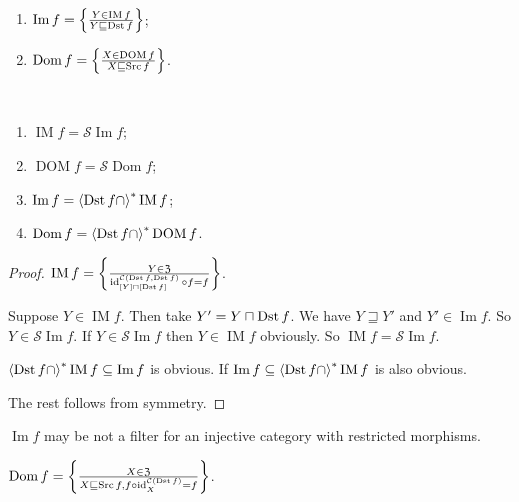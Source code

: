 \begin{defn}
~
\begin{enumerate}
\item $\operatorname{Im} f = \left\{ \frac{Y\in\operatorname{IM} f}{Y\sqsubseteq\operatorname{Dst} f}\right\}$;
\item $\operatorname{Dom} f = \left\{ \frac{X\in\operatorname{DOM} f}{X\sqsubseteq\operatorname{Src} f}\right\}$.
\end{enumerate}
\end{defn}

\begin{prop}
~
\begin{enumerate}
\item $\operatorname{IM} f = \mathscr{S}\operatorname{Im} f$;
\item $\operatorname{DOM} f = \mathscr{S}\operatorname{Dom} f$;
\item $\operatorname{Im} f = \left\langle \operatorname{Dst} f\cap\right\rangle ^{\ast}\operatorname{IM} f$;
\item $\operatorname{Dom} f = \left\langle \operatorname{Dst} f\cap\right\rangle ^{\ast}\operatorname{DOM} f$.
\end{enumerate}
\end{prop}

\begin{proof}
$\operatorname{IM} f =
\left\{ \frac{Y \in \mathfrak{Z}}{\operatorname{id}^{\mathcal{C}(\operatorname{Dst} f,\operatorname{Dst} f)}_{[Y]\sqcap[\operatorname{Dst} f]} \circ f = f}\right\}$.

Suppose $Y\in\operatorname{IM}f$. Then take $Y'=Y\sqcap\operatorname{Dst} f$. We have $Y\sqsupseteq Y'$ and $Y'\in\operatorname{Im}f$. So $Y\in\mathscr{S}\operatorname{Im}f$. If $Y\in\mathscr{S}\operatorname{Im}f$ then $Y\in\operatorname{IM}f$ obviously.
So $\operatorname{IM} f = \mathscr{S}\operatorname{Im} f$.

$\left\langle \operatorname{Dst} f\cap\right\rangle ^{\ast}\operatorname{IM}f\subseteq
\operatorname{Im}f$ is obvious. If
$\operatorname{Im}f\subseteq\left\langle \operatorname{Dst} f\cap\right\rangle ^{\ast}\operatorname{IM}f$ is also obvious.

The rest follows from symmetry.
\end{proof}

\begin{conjecture}
$\operatorname{Im} f$ may be not a filter for an injective
category with restricted morphisms.
\end{conjecture}

\begin{prop}
$\operatorname{Dom}f =
\left\{ \frac{X\in\mathfrak{Z}}{X\sqsubseteq\operatorname{Src} f,
f\circ\operatorname{id}^{\mathcal{C}(\operatorname{Dst} f)}_X=f}\right\}$.
\end{prop}

